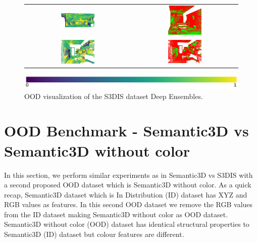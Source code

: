 \begin{figure}[h!]
\begin{tabular}{cc}
            \includegraphics[width=0.33\textwidth, height=0.18\textheight]{images/ood_imgs/fout_s3dis/pnt_1_fout_ent.pdf}& 
            \includegraphics[width=0.33\textwidth, height=0.18\textheight]{images/ood_imgs/fout_s3dis/fout_ent_3.pdf}\\

            \includegraphics[width=0.33\textwidth, height=0.18\textheight]{images/ood_imgs/fout_s3dis/ofc_42_fout_ent.pdf}& 
            \includegraphics[width=0.33\textwidth, height=0.18\textheight]{images/ood_imgs/fout_s3dis/fout_ent_1.pdf}\\
        \end{tabular}
        \includegraphics[scale=0.45]{images/prob_legend.pdf}
        \caption{OOD visualization of the S3DIS dataset Deep Ensembles.}
        \label{fig:fout_s3dis_oodmap_ent}
    \end{figure}
    \FloatBarrier


    \section{OOD Benchmark - Semantic3D vs Semantic3D without color}
    In this section, we perform similar experiments as in Semantic3D vs S3DIS with a second proposed OOD dataset which is Semantic3D without color.
    As a quick recap, Semantic3D dataset which is In Distribution (ID) dataset has XYZ and RGB values as features.
    In this second OOD dataset we remove the RGB values from the ID dataset making Semantic3D without color as OOD dataset.
    Semantic3D without color (OOD) dataset has identical structural properties to Semantic3D (ID) dataset but colour features are different.

